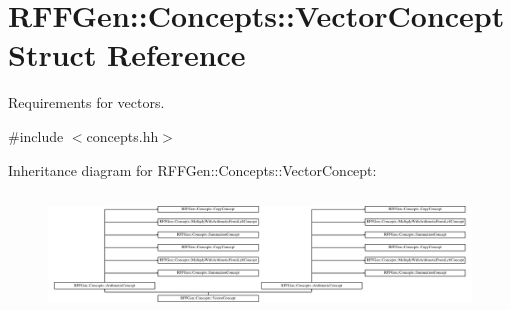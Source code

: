 \hypertarget{structRFFGen_1_1Concepts_1_1VectorConcept}{\section{R\-F\-F\-Gen\-:\-:Concepts\-:\-:Vector\-Concept Struct Reference}
\label{structRFFGen_1_1Concepts_1_1VectorConcept}
}


Requirements for vectors.  




{\ttfamily \#include $<$concepts.\-hh$>$}

Inheritance diagram for R\-F\-F\-Gen\-:\-:Concepts\-:\-:Vector\-Concept\-:\begin{figure}[H]
\begin{center}
\leavevmode
\includegraphics[height=3.172805cm]{structRFFGen_1_1Concepts_1_1VectorConcept}
\end{center}
\end{figure}
